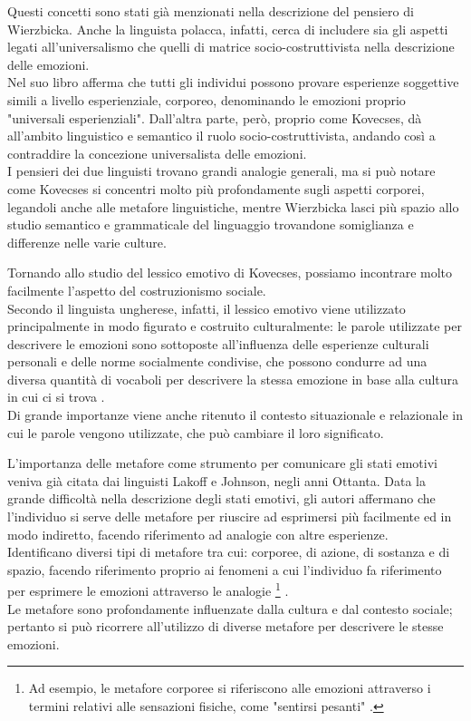 Questi concetti sono stati già menzionati nella descrizione del pensiero di Wierzbicka. Anche la linguista polacca, infatti, cerca di includere sia gli aspetti legati all'universalismo che quelli di matrice socio-costruttivista nella descrizione delle emozioni.\\
Nel suo libro afferma che tutti gli individui possono provare esperienze soggettive simili a livello esperienziale, corporeo, denominando le emozioni proprio "universali esperienziali". Dall'altra parte, però, proprio come Kovecses, dà all'ambito linguistico e semantico il ruolo socio-costruttivista, andando così a contraddire la concezione universalista delle emozioni.\\
I pensieri dei due linguisti trovano grandi analogie generali, ma si può notare come Kovecses si concentri molto più profondamente sugli aspetti corporei, legandoli anche alle metafore linguistiche, mentre Wierzbicka lasci più spazio allo studio semantico e grammaticale del linguaggio trovandone somiglianza e differenze nelle varie culture. 

Tornando allo studio del lessico emotivo di Kovecses, possiamo incontrare molto facilmente l'aspetto del costruzionismo sociale. \\
Secondo il linguista ungherese, infatti, il lessico emotivo viene  utilizzato principalmente in modo figurato e costruito culturalmente: le parole utilizzate per descrivere le emozioni sono sottoposte all'influenza delle esperienze culturali personali e delle norme socialmente condivise, che possono condurre ad una diversa quantità di vocaboli per descrivere la stessa emozione in base alla cultura in cui ci si trova \parencite{kovecses_libro_metafore}.\\
Di grande importanze viene anche ritenuto il contesto situazionale e relazionale in cui le parole vengono utilizzate, che può cambiare il loro significato.

L'importanza delle metafore come strumento per comunicare gli stati emotivi veniva già citata dai linguisti Lakoff e Johnson, negli anni Ottanta. 
Data la grande difficoltà nella descrizione degli stati emotivi, gli autori affermano che l'individuo si serve delle metafore per riuscire ad esprimersi  più facilmente ed in modo indiretto, facendo riferimento ad analogie con altre esperienze.\\
Identificano diversi tipi di metafore tra cui: corporee, di azione, di sostanza e di spazio, facendo riferimento proprio ai fenomeni a cui l'individuo fa riferimento per esprimere le emozioni attraverso le analogie \footnote{Ad esempio, le metafore corporee si riferiscono alle emozioni attraverso i termini relativi alle sensazioni fisiche, come "sentirsi pesanti" \parencite{lakoff_johnson}.} \parencite{lakoff_johnson}.\\
Le metafore sono profondamente influenzate dalla cultura e dal contesto sociale; pertanto si può ricorrere all'utilizzo di diverse metafore per descrivere le stesse emozioni. 

